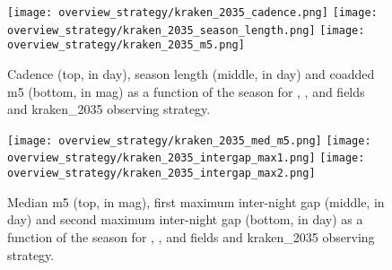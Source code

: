 \begin{figure}[!htbp]
\begin{center}
  \texttt{[image: overview\_strategy/kraken\_2035\_cadence.png]}
  \texttt{[image: overview\_strategy/kraken\_2035\_season\_length.png]}
  \texttt{[image: overview\_strategy/kraken\_2035\_m5.png]}
 \caption{Cadence (top, in day), season length (middle, in day) and coadded m5 (bottom, in mag) as a function of the season for \ddfa, \ddfb, \ddfb and \ddfd fields and kraken\_2035 observing strategy.}\label{fig:kraken_cad}
\end{center}
\end{figure}

\begin{figure}[!htbp]
\begin{center}
  
  \texttt{[image: overview\_strategy/kraken\_2035\_med\_m5.png]}
  \texttt{[image: overview\_strategy/kraken\_2035\_intergap\_max1.png]}
    \texttt{[image: overview\_strategy/kraken\_2035\_intergap\_max2.png]}
    \caption{Median m5 (top, in mag), first maximum inter-night gap (middle, in day) and second maximum inter-night gap (bottom, in day)  as a function of the season for \ddfa, \ddfb, \ddfb and \ddfd fields and kraken\_2035 observing strategy.}\label{fig:kraken_m5}
\end{center}
\end{figure}
